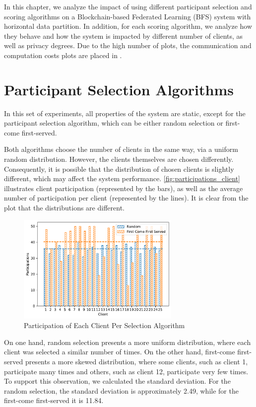 In this chapter, we analyze the impact of using different participant selection and scoring algorithms on a Blockchain-based Federated Learning (BFS) system with horizontal data partition. In addition, for each scoring algorithm, we analyze how they behave and how the system is impacted by different number of clients, as well as privacy degrees. Due to the high number of plots, the communication and computation costs plots are placed in .

\section{Participant Selection Algorithms}

In this set of experiments, all properties of the system are static, except for the participant selection algorithm, which can be either random selection or first-come first-served.

Both algorithms choose the number of clients in the same way, via a uniform random distribution. However, the clients themselves are chosen differently. Consequently, it is possible that the distribution of chosen clients is slightly different, which may affect the system performance. \autoref{fig:participations_client} illustrates client participation (represented by the bars), as well as the average number of participation per client (represented by the lines). It is clear from the plot that the distributions are different.

\begin{figure}[!ht]
    \centering
    \centering
    \includegraphics[width=0.7\textwidth]{graphics/selection/clients.pdf}
    \caption{Participation of Each Client Per Selection Algorithm}
    \label{fig:participations_client}
\end{figure}

On one hand, random selection presents a more uniform distribution, where each client was selected a similar number of times. On the other hand, first-come first-served presents a more skewed distribution, where some clients, such as client 1, participate many times and others, such as client 12, participate very few times. To support this observation, we calculated the standard deviation. For the random selection, the standard deviation is approximately 2.49, while for the first-come first-served it is 11.84.

